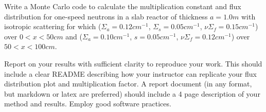 \documentclass[12pts]{exam}
\begin{document}
\begin{questions}
        \question[30] Write a Monte Carlo code to calculate the multiplication
constant and flux distribution for one-speed neutrons in a
slab reactor of thickness $a = 1.0 m$ with isotropic scattering
for which ($\Sigma_a = 0.12 cm^{-1}$, $\Sigma_s = 0.05 cm^{-1}$,
$\nu\Sigma_f= 0.15 cm^{-1}$) over $0 <x< 50 cm$ and ($\Sigma_a = 0.10 cm^{-1}$,
        $s = 0.05 cm^{-1}$, $\nu\Sigma_f = 0.12 cm^{-1}$) over $50 <x< 100 cm$.

        \question[30] Report on your results with sufficient clarity to reproduce 
        your work. This should include a clear README describing how your 
        instructor can replicate your flux distribution plot and multiplication 
        factor. A report document (in any format, but markdown or latex are 
        preferred) should include a 4 page description of your method and 
        results.
	\question Employ good software practices.

\end{questions}



%
%
\end{document}
